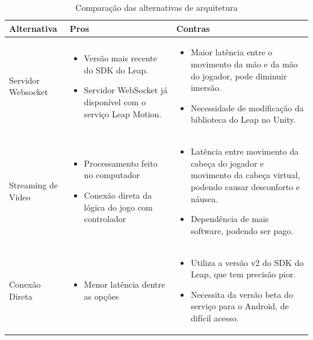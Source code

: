 \begin{table}[!h] \scriptsize
	\centering
	\begin{tabular}{|>{\centering\arraybackslash}m{2.1cm}|>{\centering\arraybackslash}m{6cm}|>{\centering\arraybackslash}m{6cm}|}
		\hline 
		\textbf{Alternativa} & \textbf{Pros} & \textbf{Contras} \\
		\hline 
		Servidor Websocket
		&\begin{itemize}[label={--},noitemsep,topsep=0pt,leftmargin=4mm]
			\item Versão mais recente do SDK do Leap.
			\item Servidor WebSocket já disponível com o serviço Leap Motion.
		\end{itemize}
		&\begin{itemize}[label={--},noitemsep,topsep=1pt,leftmargin=4mm]
			\item Maior latência entre o movimento da mão e da mão do jogador, pode diminuir imersão.
			\item Necessidade de modificação da biblioteca do Leap no Unity.
		\end{itemize}
		\\ \hline 
		Streaming de Video
		&\begin{itemize}[label={--},noitemsep,topsep=0pt,leftmargin=4mm]
			\item Processamento feito no computador
			\item Conexão direta da lógica do jogo com controlador
		\end{itemize}
		&\begin{itemize}[label={--},noitemsep,topsep=0pt,leftmargin=4mm]
			\item Latência entre movimento da cabeça do jogador e movimento da cabeça virtual, podendo causar desconforto e náusea.
			\item Dependência de mais software, podendo ser pago.
		\end{itemize}
	    \\ \hline 
		Conexão Direta
		&\begin{itemize}[label={--},noitemsep,topsep=0pt,leftmargin=4mm]
				\item Menor latência dentre as opções
			\end{itemize}
		&\begin{itemize}[label={--},noitemsep,topsep=0pt,leftmargin=4mm]
				\item Utiliza a versão v2 do SDK do Leap, que tem precisão pior.
				\item Necessita da versão beta do serviço para o Android, de difícil acesso.
			\end{itemize}
		\\ 
		\hline 
	\end{tabular} 
	\caption[Comparação das alternativas de arquitetura]{Comparação das alternativas de arquitetura}
\label{tabela:alternativas-arquiteturas}
\end{table}

